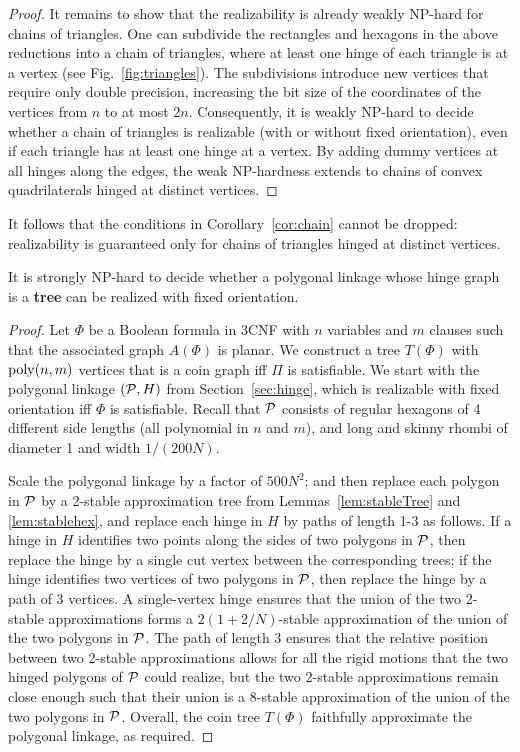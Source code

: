 \documentclass[runningheads]{article}
\newcommand{\PP}{{\cal P}} %
\begin{document}
\begin{proof}
It remains to show that the realizability is already weakly NP-hard for chains of triangles.
One can subdivide the rectangles and hexagons in the above reductions into a chain of triangles, where at least one hinge of each triangle is at a vertex (see Fig.~\ref{fig:triangles}). The subdivisions introduce new vertices that require only double precision, increasing the bit size of the coordinates of the vertices from $n$ to at most $2n$. Consequently, it is weakly NP-hard to decide whether a chain of triangles is realizable (with or without fixed orientation), even if each triangle has at least one hinge at a vertex. By adding dummy vertices at all hinges along the edges, the weak NP-hardness extends to chains of convex quadrilaterals hinged at distinct vertices.
\end{proof}

It follows that the conditions in Corollary~\ref{cor:chain} cannot be dropped: realizability is guaranteed only for chains of triangles hinged at distinct vertices.

\begin{theorem}
It is strongly NP-hard to decide whether a polygonal linkage whose hinge graph is a \textbf{tree} can be realized with fixed orientation.
\end{theorem}
\begin{proof}
Let $\Phi$ be a Boolean formula in 3CNF with $n$ variables and $m$ clauses such that the associated graph $A(\Phi)$ is planar.
We construct a tree $T(\Phi)$ with ${\rm poly}(n,m)$ vertices that is a coin graph iff $\Pi$ is satisfiable. We start with the polygonal linkage $(\PP,H)$ from Section~\ref{sec:hinge}, which is realizable with fixed orientation iff $\Phi$ is satisfiable. Recall that $\PP$ consists of regular hexagons of 4 different side lengths (all polynomial in $n$ and $m$), and long and skinny rhombi of diameter 1 and width $1/(200N)$.

Scale the polygonal linkage by a factor of $500N^2$; and then replace each polygon in $\PP$ by a 2-stable approximation tree from Lemmas~\ref{lem:stableTree} and \ref{lem:stablehex}, and replace each hinge in $H$ by paths of length 1-3 as follows. If a hinge in $H$ identifies two points along the sides of two polygons in $\PP$, then replace the hinge by a single cut vertex between the corresponding trees; if the hinge identifies two vertices of two polygons in $\PP$, then replace the hinge by a path of 3 vertices. A single-vertex hinge ensures that the union of the two 2-stable approximations forms a $2(1+2/N)$-stable approximation of the union of the two polygons in $\PP$. The path of length 3 ensures that the relative position between two 2-stable approximations allows for all the rigid motions that the two hinged polygons of $\PP$ could realize, but the two 2-stable approximations remain close enough such that their union is a 8-stable approximation of the union of the two polygons in $\PP$. Overall, the coin tree $T(\Phi)$ faithfully approximate the polygonal linkage, as required.
\end{proof}
\end{document}
